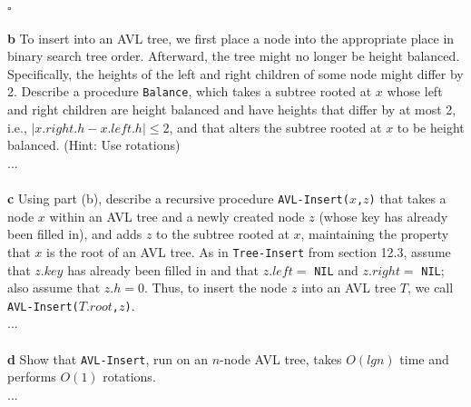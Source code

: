 \documentclass[11pt,english]{article}
\begin{document}
\hfill $\square$
\\\\
\noindent \large{\textbf{b} \mdseries To insert into an AVL tree, we first
place a node into the appropriate place in binary search tree order.
Afterward, the tree might no longer be height balanced. Specifically, the
heights of the left and right children of some node might differ by 2.
Describe a procedure \texttt{Balance}, which takes a subtree rooted at $x$
whose left and right children are height balanced and have heights that differ
by at most 2, i.e., $|x.right.h - x.left.h| \leq 2$, and that alters the
subtree rooted at $x$ to be height balanced. (Hint: Use rotations)}
\\
...
\\\\
\noindent \large{\textbf{c} \mdseries Using part (b), describe a recursive
procedure \texttt{AVL-Insert($x$,$z$)} that takes a node $x$ within an AVL
tree and a newly created node $z$ (whose key has already been filled in), and
adds $z$ to the subtree rooted at $x$, maintaining the property that $x$ is
the root of an AVL tree. As in \texttt{Tree-Insert} from section 12.3, assume
that $z.key$ has already been filled in and that $z.left =$ \texttt{NIL} and
$z.right =$ \texttt{NIL}; also assume that $z.h = 0$. Thus, to insert the node
$z$ into an AVL tree $T$, we call \texttt{AVL-Insert($T.root$,$z$)}.}
\\
...
\\\\
\noindent \large{\textbf{d} \mdseries Show that \texttt{AVL-Insert}, run on an
$n$-node AVL tree, takes $O(lg n)$ time and performs $O(1)$ rotations.}
\\
...








\end{document}

